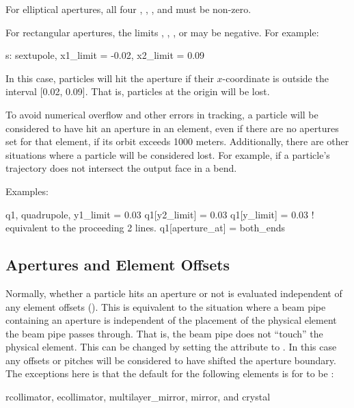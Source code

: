 For elliptical apertures, all four , , , and 
must be non-zero.

For rectangular apertures, the limits , , , or 
may be negative. For example:
\begin{example}
  s: sextupole, x1_limit = -0.02, x2_limit = 0.09
\end{example}
In this case, particles will hit the aperture if their $x$-coordinate is outside the interval [0.02,
0.09]. That is, particles at the origin will be lost.

To avoid numerical overflow and other errors in tracking, a particle will be considered to have hit
an aperture in an element, even if there are no apertures set for that element, if its orbit exceeds
1000 meters. Additionally, there are other situations where a particle will be considered lost. For
example, if a particle's trajectory does not intersect the output face in a bend.

Examples:
\begin{example}
  q1, quadrupole, y1_limit = 0.03
  q1[y2_limit] = 0.03
  q1[y_limit] = 0.03  ! equivalent to the proceeding 2 lines.  
  q1[aperture_at] = both_ends
\end{example}

\subsection{Apertures and Element Offsets}
\label{s:offset.ap}

Normally, whether a particle hits an aperture or not is evaluated independent of any element offsets
(). This is equivalent to the situation where a beam pipe containing an aperture is
independent of the placement of the physical element the beam pipe passes through. That is, the beam
pipe does not ``touch'' the physical element. This can be changed by setting the
 attribute to . In this case any offsets or pitches will be
considered to have shifted the aperture boundary. The exceptions here is that the default for the
following elements is for  to be :
\begin{example}
  rcollimator, 
  ecollimator,
  multilayer_mirror, 
  mirror, and 
  crystal 
\end{example}

